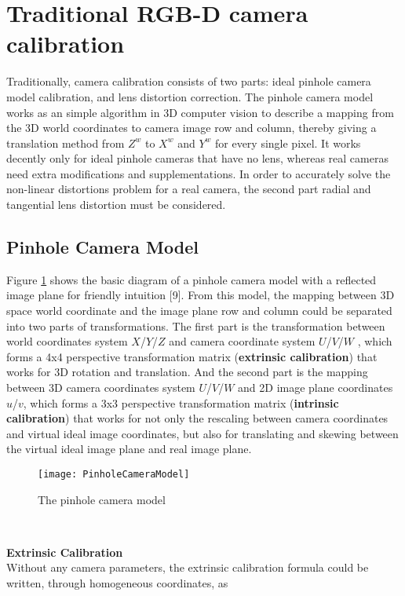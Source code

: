 \section{Traditional RGB-D camera calibration} %
\label{sens_TraditionalCalibration} %
Traditionally, camera calibration consists of two parts: ideal pinhole camera model calibration, and lens distortion correction. The pinhole camera model works as an simple algorithm in 3D computer vision to describe a mapping from the 3D world coordinates to camera image row and column, thereby giving a translation method from \(Z^{w}\) to \(X^{w}\)  and \(Y^{w}\)  for every single pixel. It works decently only for ideal pinhole cameras that have no lens, whereas real cameras need extra modifications and supplementations. In order to accurately solve the non-linear distortions problem for a real camera, the second part radial and tangential lens distortion must be considered.\\\par

\subsection{Pinhole Camera Model}
\label{sectionPinholeCamera}
Figure \ref{PinholeCameraModel} shows the basic diagram of a pinhole camera model with a reflected image plane for friendly intuition
[9].%
From this model, the mapping between 3D space world coordinate and the image plane row and column could be separated into two parts of transformations. The first part is the transformation between world coordinates system \(X\)/\(Y\)/\(Z\) and camera coordinate system \(U\)/\(V\)/\(W\) , which forms a 4x4 perspective transformation matrix (\textbf{extrinsic calibration}) that works for 3D rotation and translation. And the second part is the mapping between 3D camera coordinates system \(U\)/\(V\)/\(W\) and 2D image plane coordinates  \(u\)/\(v\), which forms a 3x3 perspective transformation matrix (\textbf{intrinsic calibration}) that works for not only the rescaling between camera coordinates and virtual ideal image coordinates, but also for translating and skewing between the virtual ideal image plane and real image plane. %
%
\begin{figure}[h]
\centering
\texttt{[image: PinholeCameraModel]}
\caption{The pinhole camera model}
\label{PinholeCameraModel}
\end{figure}%
%
\\\par%
\textbf{Extrinsic Calibration}\\
Without any camera parameters, the extrinsic calibration formula could be written, through homogeneous coordinates, as

